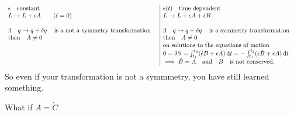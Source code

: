 \documentclass{article}
\begin{document}
\[
    \begin{array}{l|l}
        \epsilon \qq{constant}                                       & \epsilon(t)\qq{time dependent}                                                                                   \\
        L\to L+\epsilon A \qquad(\dot{\epsilon}=0)                   & L\to L+\epsilon A+\dot{\epsilon}B                                                                                \\
                                                                     &                                                                                                                  \\
        \qif* q\to q+\var{q} \qq{is a not a symmetry transformation} & \qif* q\to q+\var{q} \qq{is a symmetry transformation}                                                           \\
        \qthen*   A\neq 0                                            & \qthen*  A\neq 0                                                                                                 \\
                                                                     & \qq*{on solutions to the equations of motion}                                                                    \\
                                                                     & 0=\var{S}=\int_{t_1}^{t_2}(\dot{\epsilon}B+\epsilon A)\dd{t}=-\int_{t_1}^{t_2}(\epsilon\dot{B}+\epsilon A)\dd{t} \\
                                                                     & \implies  \dot{B}=A\qand B \qq{is not conserved.}                                                                \\
    \end{array}
\]
So even if your transformation is not a symmmetry, you have still learned something.

What if $A=\dot{C}$
\end{document}
